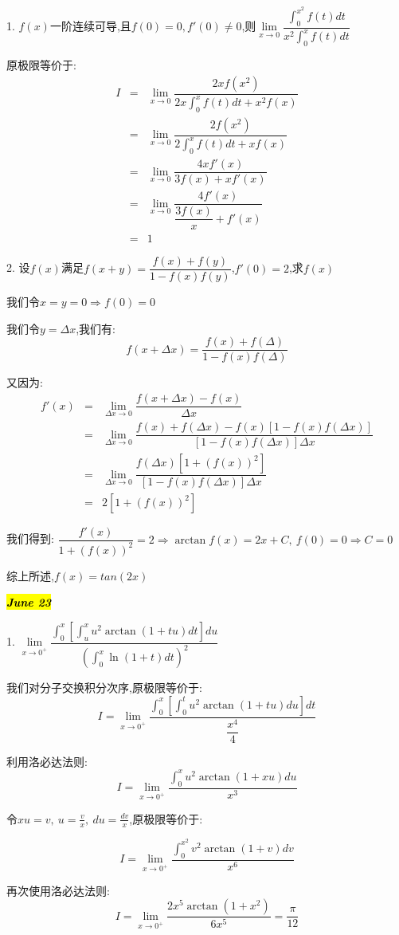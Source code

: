 1. $f(x)$一阶连续可导,且$f(0)=0,f'(0)\neq 0$,则$\lim\limits_{x\rightarrow 0}\dfrac{\int_{0}^{x^2}f(t)dt}{x^2\int_{0}^{x}f(t)dt}$
\begin{solution}
	
	原极限等价于: 
	\begin{eqnarray*}
		I&=&\lim\limits_{x\rightarrow 0}\dfrac{2xf(x^2)}{2x\int_{0}^{x}f(t)dt+x^2f(x)}\\
		&=&\lim\limits_{x\rightarrow 0}\dfrac{2f(x^2)}{2\int_{0}^{x}f(t)dt+xf(x)}\\
		&=&\lim\limits_{x\rightarrow 0}\dfrac{4xf'(x)}{3f(x)+xf'(x)}\\
		&=&\lim\limits_{x\rightarrow 0}\dfrac{4f'(x)}{\dfrac{3f(x)}{x}+f'(x)}\\
		&=&1
	\end{eqnarray*}
\end{solution}


2. 设$f(x)$满足$f(x+y)=\dfrac{f(x)+f(y)}{1-f(x)f(y)}$,$f'(0)=2$,求$f(x)$
\begin{solution}
	
	我们令$x=y=0\Rightarrow f(0)=0$
	
	我们令$y=\Delta x$,我们有: 
	$$f(x+\Delta x)=\dfrac{f(x)+f(\Delta)}{1-f(x)f(\Delta)}$$
	
	又因为: 
	\begin{eqnarray*}
		f'(x)&=&\lim\limits_{\Delta x\rightarrow 0}\dfrac{f(x+\Delta x)-f(x)}{\Delta x}\\
		&=&\lim\limits_{\Delta x\rightarrow 0}\dfrac{f(x )+f(\Delta x)-f(x)[1-f(x)f(\Delta x)]}{[1-f(x)f(\Delta x)]\Delta x}\\
		&=&\lim\limits_{\Delta x\rightarrow 0}\dfrac{f(\Delta x)[1+(f(x))^2]}{[1-f(x)f(\Delta x)]\Delta x}\\
		&=&2[1+(f(x))^2]
	\end{eqnarray*}
	
	我们得到: $\dfrac{f'(x)}{1+(f(x))^2}=2\Rightarrow \arctan f(x)=2x+C,\ f(0)=0\Rightarrow C=0$
	
	综上所述,$f(x)=tan (2x)$
\end{solution}


\hl{\textbf{\textit{June 23}}}

1. $\lim\limits_{x\rightarrow 0^{+}}\dfrac{\int_{0}^{x}[\int_{u}^{x}u^2\arctan (1+tu)dt]du}{(\int_{0}^{x}\ln(1+t)dt)^2}$
\begin{solution}
	
	我们对分子交换积分次序,原极限等价于: 
	$$I=\lim\limits_{x\rightarrow 0^{+}}\dfrac{\int_{0}^{x}[\int_{0}^{t}u^2\arctan (1+tu)du]dt}{\dfrac{x^4}{4}}$$
	
	利用洛必达法则: 
	$$I=\lim\limits_{x\rightarrow 0^{+}}\dfrac{\int_{0}^{x}u^2\arctan (1+xu)du}{x^3}$$
	
	令$xu=v,\ u=\frac{v}{x},\ du=\frac{dv}{x}$,原极限等价于: 
	
	$$I=\lim\limits_{x\rightarrow 0^{+}}\dfrac{\int_{0}^{x^2}v^2\arctan (1+v)dv}{x^6}$$
	
	再次使用洛必达法则: 
	$$I=\lim\limits_{x\rightarrow 0^{+}}\dfrac{2x^5\arctan (1+x^2)}{6x^5}=\dfrac{\pi}{12}$$
\end{solution}

